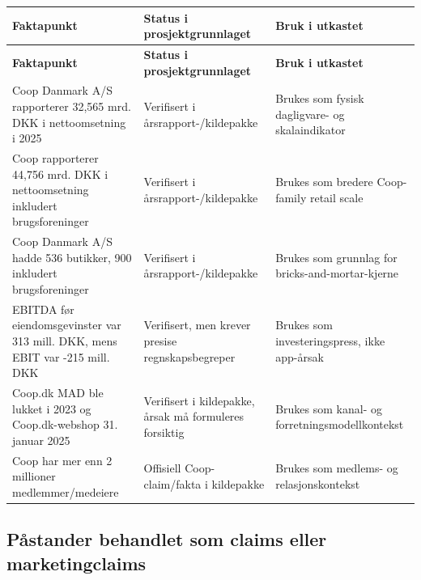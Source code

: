 \documentclass[12pt,a4paper]{article}
\begin{document}
\begin{longtable}{p{} p{} p{}}
\toprule
\textbf{Faktapunkt} & \textbf{Status i prosjektgrunnlaget} & \textbf{Bruk i utkastet} \\
\midrule
\endfirsthead
\toprule
\textbf{Faktapunkt} & \textbf{Status i prosjektgrunnlaget} & \textbf{Bruk i utkastet} \\
\midrule
\endhead
Coop Danmark A/S rapporterer 32,565 mrd. DKK i nettoomsetning i 2025 & Verifisert i årsrapport-/kildepakke & Brukes som fysisk dagligvare- og skalaindikator \\
Coop rapporterer 44,756 mrd. DKK i nettoomsetning inkludert brugsforeninger & Verifisert i årsrapport-/kildepakke & Brukes som bredere Coop-family retail scale \\
Coop Danmark A/S hadde 536 butikker, 900 inkludert brugsforeninger & Verifisert i årsrapport-/kildepakke & Brukes som grunnlag for bricks-and-mortar-kjerne \\
EBITDA før eiendomsgevinster var 313 mill. DKK, mens EBIT var -215 mill. DKK & Verifisert, men krever presise regnskapsbegreper & Brukes som investeringspress, ikke app-årsak \\
Coop.dk MAD ble lukket i 2023 og Coop.dk-webshop 31. januar 2025 & Verifisert i kildepakke, årsak må formuleres forsiktig & Brukes som kanal- og forretningsmodellkontekst \\
Coop har mer enn 2 millioner medlemmer/medeiere & Offisiell Coop-claim/fakta i kildepakke & Brukes som medlems- og relasjonskontekst \\
\bottomrule
\end{longtable}

\subsection*{Påstander behandlet som claims eller marketingclaims}
\end{document}
